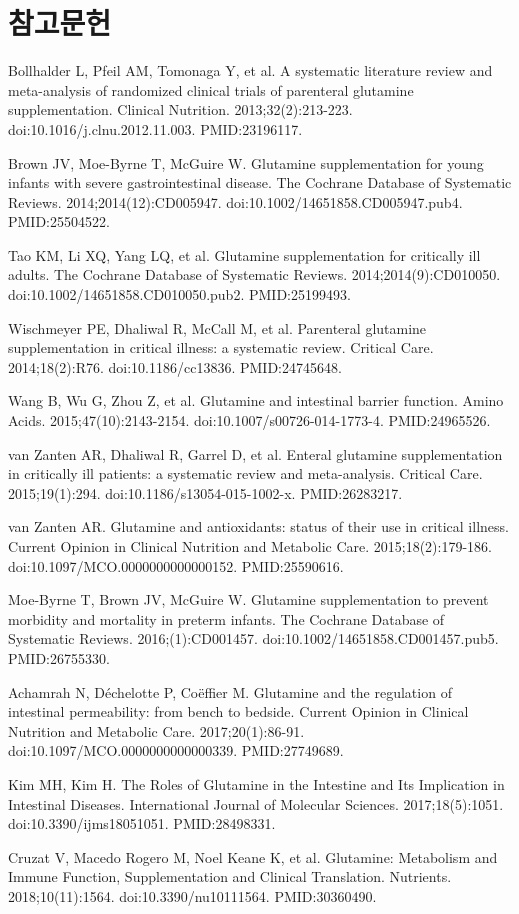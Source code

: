 \documentclass[11pt,oneside]{book}
\newcommand{\refstart}{\par\begingroup\footnotesize\setlength{\parskip}{2.5pt}\raggedright}
\newcommand{\reff}[2]{\par\hangindent=7mm\hangafter=1\noindent[#1]\hspace{2mm}#2\par}
\begin{document}
\section*{참고문헌}
\refstart
\reff{1}{Bollhalder L, Pfeil AM, Tomonaga Y, et al. A systematic literature review and meta-analysis of randomized clinical trials of parenteral glutamine supplementation. Clinical Nutrition. 2013;32(2):213-223. doi:10.1016/j.clnu.2012.11.003. PMID:23196117.}
\reff{2}{Brown JV, Moe-Byrne T, McGuire W. Glutamine supplementation for young infants with severe gastrointestinal disease. The Cochrane Database of Systematic Reviews. 2014;2014(12):CD005947. doi:10.1002/14651858.CD005947.pub4. PMID:25504522.}
\reff{3}{Tao KM, Li XQ, Yang LQ, et al. Glutamine supplementation for critically ill adults. The Cochrane Database of Systematic Reviews. 2014;2014(9):CD010050. doi:10.1002/14651858.CD010050.pub2. PMID:25199493.}
\reff{4}{Wischmeyer PE, Dhaliwal R, McCall M, et al. Parenteral glutamine supplementation in critical illness: a systematic review. Critical Care. 2014;18(2):R76. doi:10.1186/cc13836. PMID:24745648.}
\reff{5}{Wang B, Wu G, Zhou Z, et al. Glutamine and intestinal barrier function. Amino Acids. 2015;47(10):2143-2154. doi:10.1007/s00726-014-1773-4. PMID:24965526.}
\reff{6}{van Zanten AR, Dhaliwal R, Garrel D, et al. Enteral glutamine supplementation in critically ill patients: a systematic review and meta-analysis. Critical Care. 2015;19(1):294. doi:10.1186/s13054-015-1002-x. PMID:26283217.}
\reff{7}{van Zanten AR. Glutamine and antioxidants: status of their use in critical illness. Current Opinion in Clinical Nutrition and Metabolic Care. 2015;18(2):179-186. doi:10.1097/MCO.0000000000000152. PMID:25590616.}
\reff{8}{Moe-Byrne T, Brown JV, McGuire W. Glutamine supplementation to prevent morbidity and mortality in preterm infants. The Cochrane Database of Systematic Reviews. 2016;(1):CD001457. doi:10.1002/14651858.CD001457.pub5. PMID:26755330.}
\reff{9}{Achamrah N, Déchelotte P, Coëffier M. Glutamine and the regulation of intestinal permeability: from bench to bedside. Current Opinion in Clinical Nutrition and Metabolic Care. 2017;20(1):86-91. doi:10.1097/MCO.0000000000000339. PMID:27749689.}
\reff{10}{Kim MH, Kim H. The Roles of Glutamine in the Intestine and Its Implication in Intestinal Diseases. International Journal of Molecular Sciences. 2017;18(5):1051. doi:10.3390/ijms18051051. PMID:28498331.}
\reff{11}{Cruzat V, Macedo Rogero M, Noel Keane K, et al. Glutamine: Metabolism and Immune Function, Supplementation and Clinical Translation. Nutrients. 2018;10(11):1564. doi:10.3390/nu10111564. PMID:30360490.}
\end{document}
